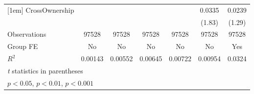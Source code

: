 {\begin{tabular}{l*{6}{c}}
[1em]
CrossOwnership  &                  &                  &                  &                  &   0.0335         &   0.0239         \\
                &                  &                  &                  &                  &   (1.83)         &   (1.29)         \\
\hline
Observations    &    97528         &    97528         &    97528         &    97528         &    97528         &    97528         \\
Group FE        &       No         &       No         &       No         &       No         &       No         &      Yes         \\
$ R^2 $         &  0.00143         &  0.00552         &  0.00645         &  0.00722         &  0.00954         &   0.0324         \\
\hline\hline
\multicolumn{7}{l}{\footnotesize \textit{t} statistics in parentheses}\\
\multicolumn{7}{l}{\footnotesize \sym{*} \(p<0.05\), \sym{**} \(p<0.01\), \sym{***} \(p<0.001\)}\\
\end{tabular}
}
